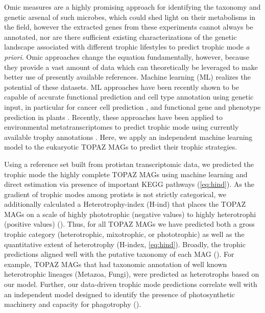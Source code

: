 \documentclass[12pt]{article}
\numberwithin{equation}{section}
\begin{document}
Omic measures are a highly promising approach for identifying the taxonomy and genetic arsenal of such microbes, which could shed light on their metabolisms in the field, however the extracted genes from these experiments cannot always be annotated, nor are there sufficient existing characterizations of the genetic landscape associated with different trophic lifestyles to predict trophic mode \textit{a priori}. Omic approaches change the equation fundamentally, however, because they provide a vast amount of data which can theoretically be leveraged to make better use of presently available references. Machine learning (ML) realizes the potential of these datasets. ML approaches have been recently shown to be capable of accurate functional prediction and cell type annotation using genetic input, in particular for cancer cell prediction \citep{shipp2002diffuse,bashiri2017improving,tabl2019machine}, and functional gene and phenotype prediction in plants \citep{mahood2020machine}. Recently, these approaches have been applied to environmental metatranscriptomes to predict trophic mode using currently available trophy annotations \citep{lambert2021dynamic}. Here, we apply an independent machine learning model to the eukaryotic TOPAZ MAGs to predict their trophic strategies.

Using a reference set built from protistan transcriptomic data, we predicted the trophic mode the highly complete TOPAZ MAGs using machine learning and direct estimation via presence of important KEGG pathways (\cref{eq:hind}). As the gradient of trophic modes among protists is not strictly categorical, we additionally calculated a Heterotrophy-index (H-ind) that places the TOPAZ MAGs on a scale of highly phototrophic (negative values) to highly heterotrophi (positive values) (). Thus, for all TOPAZ MAGs we have predicted both a gross trophic category (heterotrophic, mixotrophic, or phototrophic) as well as the quantitative extent of heterotrophy (H-index, \cref{eq:hind}). Broadly, the trophic predictions aligned well with the putative taxonomy of each MAG (). For example, TOPAZ MAGs that had taxonomic annotation of well known heterotrophic lineages (Metazoa, Fungi),  were predicted as heterotrophs based on our model.  Further, our data-driven trophic mode predictions correlate well with an independent model designed to identify the presence of photosynthetic machinery and capacity for phagotrophy \citep{burns2018gene} (). 
\end{document}
